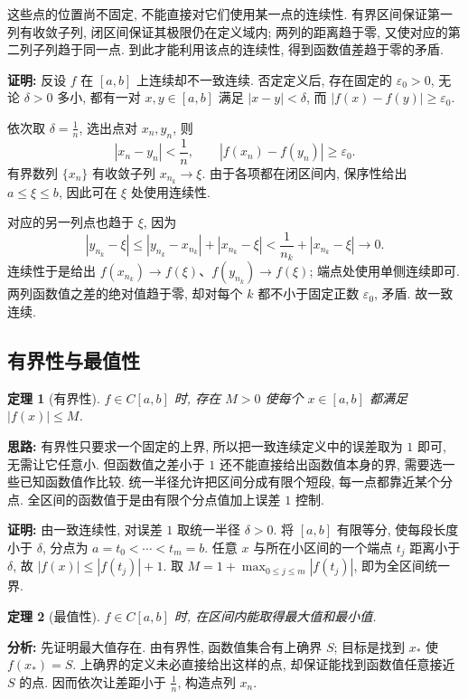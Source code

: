 \documentclass[UTF8,openany]{ctexbook}
\theoremstyle{chinesetextbook}
\newtheorem{theorem}{定理}[section]
\newenvironment{cnproof}{\par\indent\textbf{证明:} \ignorespaces}{\par}
\begin{document}
这些点的位置尚不固定, 不能直接对它们使用某一点的连续性. 有界区间保证第一列有收敛子列, 闭区间保证其极限仍在定义域内; 两列的距离趋于零, 又使对应的第二列子列趋于同一点. 到此才能利用该点的连续性, 得到函数值差趋于零的矛盾.
\begin{cnproof}
反设 $f$ 在 $[a,b]$ 上连续却不一致连续. 否定定义后, 存在固定的 $\varepsilon_0>0$, 无论 $\delta>0$ 多小, 都有一对 $x,y\in[a,b]$ 满足 $|x-y|<\delta$, 而 $|f(x)-f(y)|\ge\varepsilon_0$.

依次取 $\displaystyle\delta=\frac1n$, 选出点对 $x_n,y_n$, 则
\[
|x_n-y_n|<\frac1n,\qquad |f(x_n)-f(y_n)|\ge\varepsilon_0.
\]
有界数列 $\{x_n\}$ 有收敛子列 $x_{n_k}\to\xi$. 由于各项都在闭区间内, 保序性给出 $a\le\xi\le b$, 因此可在 $\xi$ 处使用连续性.

对应的另一列点也趋于 $\xi$, 因为
\[
|y_{n_k}-\xi|\le|y_{n_k}-x_{n_k}|+|x_{n_k}-\xi|
<\frac1{n_k}+|x_{n_k}-\xi|\to0.
\]
连续性于是给出 $f(x_{n_k})\to f(\xi)$、$f(y_{n_k})\to f(\xi)$; 端点处使用单侧连续即可. 两列函数值之差的绝对值趋于零, 却对每个 $k$ 都不小于固定正数 $\varepsilon_0$, 矛盾. 故一致连续.
\end{cnproof}
\subsection{有界性与最值性}
\begin{theorem}[有界性]
$f\in C[a,b]$ 时, 存在 $M>0$ 使每个 $x\in[a,b]$ 都满足 $|f(x)|\le M$.
\end{theorem}
\par\indent\textbf{思路:} 有界性只要求一个固定的上界, 所以把一致连续定义中的误差取为 $1$ 即可, 无需让它任意小. 但函数值之差小于 $1$ 还不能直接给出函数值本身的界, 需要选一些已知函数值作比较. 统一半径允许把区间分成有限个短段, 每一点都靠近某个分点. 全区间的函数值于是由有限个分点值加上误差 $1$ 控制.

\begin{cnproof}
由一致连续性, 对误差 $1$ 取统一半径 $\delta>0$. 将 $[a,b]$ 有限等分, 使每段长度小于 $\delta$, 分点为 $a=t_0<\cdots<t_m=b$. 任意 $x$ 与所在小区间的一个端点 $t_j$ 距离小于 $\delta$, 故 $|f(x)|\le|f(t_j)|+1$. 取 $M=1+\max_{0\le j\le m}|f(t_j)|$, 即为全区间统一界.
\end{cnproof}
\begin{theorem}[最值性]
$f\in C[a,b]$ 时, 在区间内能取得最大值和最小值.
\end{theorem}
\par\indent\textbf{分析:} 先证明最大值存在. 由有界性, 函数值集合有上确界 $S$; 目标是找到 $x_*$ 使 $f(x_*)=S$. 上确界的定义未必直接给出这样的点, 却保证能找到函数值任意接近 $S$ 的点. 因而依次让差距小于 $\displaystyle\frac1n$, 构造点列 $x_n$.
\end{document}
